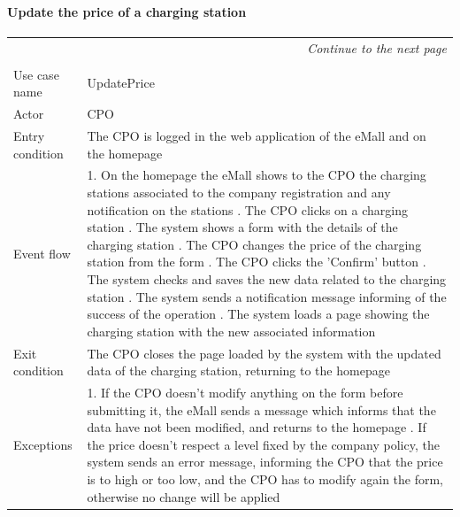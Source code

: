 \paragraph{Update the price of a charging station}
\begin{center}
    \begin{longtable}{p{4cm} p{11cm}}
    \multicolumn{2}{r}{\itshape{Continue to the next page}}\\
    \endfoot 
    \\
    \endlastfoot
    \hline
     Use case name &  UpdatePrice\\
     \hline
     Actor & CPO \\
     \hline
     Entry condition & The CPO is logged in the web application of the eMall and on the homepage \\
     \hline
     Event flow &   1. On the homepage the eMall shows to the CPO the charging stations associated to the company                   registration and any notification on the stations \newline
                    2. The CPO clicks on a charging station \newline 
                    3. The system shows a form with the details of the charging station \newline
                    4. The CPO changes the price of the charging station from the form \newline
                    5. The CPO clicks the 'Confirm' button \newline
                    6. The system checks and saves the new data related to the charging station \newline
                    7. The system sends a notification message informing of the success of the operation \newline
                    8. The system loads a page showing the charging station with the new associated information\\
     \hline
     Exit condition &  The CPO closes the page loaded by the system with the updated data of the charging station, returning to the homepage \\
     \hline
     Exceptions &   1. If the CPO doesn't modify anything on the form before submitting it, the eMall sends a                       message which informs that the data have not been modified, and returns to the homepage \newline
                    2. If the price doesn't respect a level fixed by the company policy, the system sends an error message, informing the CPO that the price is to high or too low, and the CPO has to modify again the form, otherwise no change will be applied \newline

\end{longtable}
\end{center}
